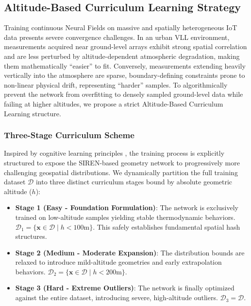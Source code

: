 \subsection{Altitude-Based Curriculum Learning Strategy}
\label{subsec:curriculum_learning}

Training continuous Neural Fields on massive and spatially heterogeneous IoT data presents severe convergence challenges. In an urban VLL environment, measurements acquired near ground-level arrays exhibit strong spatial correlation and are less perturbed by altitude-dependent atmospheric degradation, making them mathematically ``easier'' to fit. Conversely, measurements extending heavily vertically into the atmosphere are sparse, boundary-defining constraints prone to non-linear physical drift, representing ``harder'' samples. To algorithmically prevent the network from overfitting to densely sampled ground-level data while failing at higher altitudes, we propose a strict Altitude-Based Curriculum Learning structure.

\subsubsection{Three-Stage Curriculum Scheme}
Inspired by cognitive learning principles \cite{bengio2009curriculum}, the training process is explicitly structured to expose the SIREN-based geometry network to progressively more challenging geospatial distributions. We dynamically partition the full training dataset $\mathcal{D}$ into three distinct curriculum stages bound by absolute geometric altitude ($h$):
\begin{itemize}
    \item \textbf{Stage 1 (Easy - Foundation Formulation)}: The network is exclusively trained on low-altitude samples yielding stable thermodynamic behaviors. $\mathcal{D}_1 = \{ \mathbf{x} \in \mathcal{D} \mid h < 100\text{m} \}$. This safely establishes fundamental spatial hash structures.
    \item \textbf{Stage 2 (Medium - Moderate Expansion)}: The distribution bounds are relaxed to introduce mild-altitude geometries and early extrapolation behaviors. $\mathcal{D}_2 = \{ \mathbf{x} \in \mathcal{D} \mid h < 200\text{m} \}$.
    \item \textbf{Stage 3 (Hard - Extreme Outliers)}: The network is finally optimized against the entire dataset, introducing severe, high-altitude outliers. $\mathcal{D}_3 = \mathcal{D}$.
\end{itemize}

